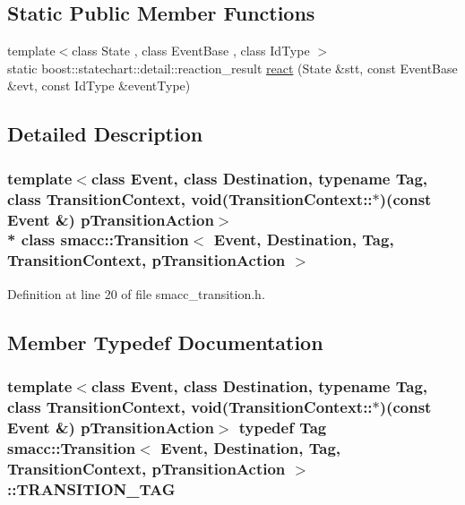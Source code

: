 \subsection*{Static Public Member Functions}
\begin{DoxyCompactItemize}
\item 
{\footnotesize template$<$class State , class Event\+Base , class Id\+Type $>$ }\\static boost\+::statechart\+::detail\+::reaction\+\_\+result \hyperlink{classsmacc_1_1Transition_a8399e8d49fa6f3ac72b06df0b2010932}{react} (State \&stt, const Event\+Base \&evt, const Id\+Type \&event\+Type)
\end{DoxyCompactItemize}


\subsection{Detailed Description}
\subsubsection*{template$<$class Event, class Destination, typename Tag, class Transition\+Context, void(\+Transition\+Context\+::$\ast$)(const Event \&) p\+Transition\+Action$>$\\*
class smacc\+::\+Transition$<$ Event, Destination, Tag, Transition\+Context, p\+Transition\+Action $>$}



Definition at line 20 of file smacc\+\_\+transition.\+h.



\subsection{Member Typedef Documentation}
\subsubsection[{\texorpdfstring{T\+R\+A\+N\+S\+I\+T\+I\+O\+N\+\_\+\+T\+AG}{TRANSITION_TAG}}]{\setlength{\rightskip}{0pt plus 5cm}template$<$class Event, class Destination, typename Tag, class Transition\+Context, void(\+Transition\+Context\+::$\ast$)(const Event \&) p\+Transition\+Action$>$ typedef Tag {\bf smacc\+::\+Transition}$<$ Event, Destination, Tag, Transition\+Context, p\+Transition\+Action $>$\+::{\bf T\+R\+A\+N\+S\+I\+T\+I\+O\+N\+\_\+\+T\+AG}}\hypertarget{classsmacc_1_1Transition_a672e883135344c4aea140381dd4d1c1d}{}\label{classsmacc_1_1Transition_a672e883135344c4aea140381dd4d1c1d}


